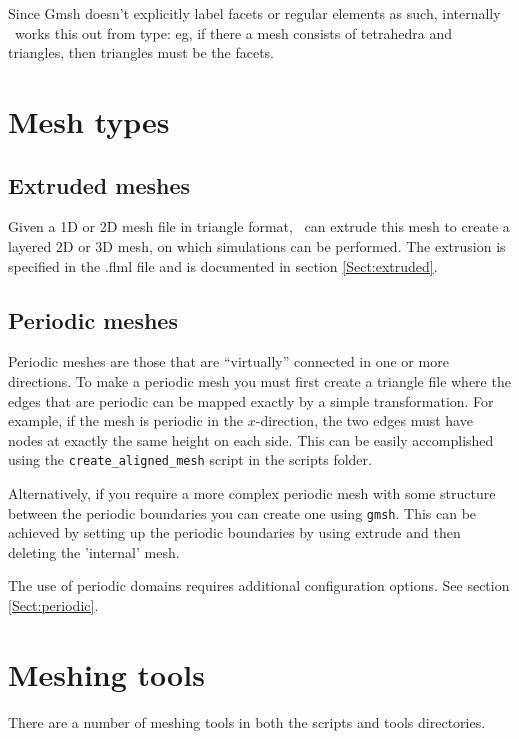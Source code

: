 Since Gmsh doesn't explicitly label facets or regular elements as such,
internally \fluidity\ works this out from type: eg, if there a mesh consists
of tetrahedra and triangles, then triangles must be the facets.

\section{Mesh types}
\subsection{Extruded meshes}
\label{sect:extruded_meshes}

Given a 1D or 2D mesh file in triangle format, \fluidity\ can extrude this
mesh to create a layered 2D or 3D mesh, on which simulations can be
performed. The extrusion is specified in the .flml file and is documented in
section \ref{Sect:extruded}.

\subsection{Periodic meshes}
\label{mesh!mesh types!periodic} 
Periodic meshes are those that are ``virtually'' connected in one or more directions. To make a periodic
mesh you must first create a triangle file where the edges that are periodic
can be mapped exactly by a simple transformation. For example, if the mesh
is periodic in the $x$-direction, the two edges must have nodes at exactly the
same height on each side. This can be easily accomplished using the
\lstinline[language=Bash]+create_aligned_mesh+ script in the scripts folder.

Alternatively, if you require a more complex periodic mesh with some structure between the periodic 
boundaries you can create one using \lstinline[language=Bash]{gmsh}. This can be achieved by 
setting up the periodic boundaries by using extrude and then deleting the 'internal' mesh.

The use of periodic domains requires additional configuration options. See
section \ref{Sect:periodic}.

\section{Meshing tools}

There are a number of meshing tools in both the scripts and tools directories.

